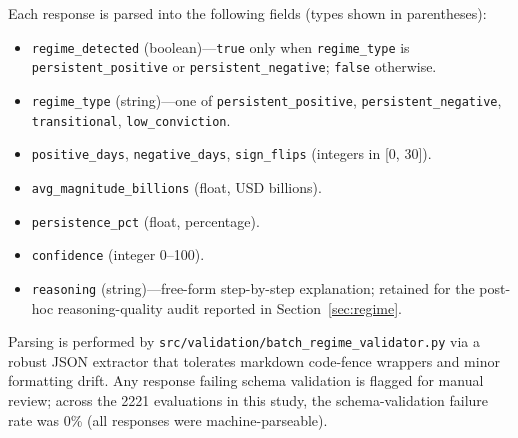 \documentclass[jrfm,article,accept,moreauthors,pdftex]{Definitions/mdpi}
\begin{document}
Each response is parsed into the following fields (types shown in
parentheses):

\begin{itemize}
    \item \texttt{regime\_detected} (boolean)---\texttt{true} only when
          \texttt{regime\_type} is \texttt{persistent\_positive} or
          \texttt{persistent\_negative}; \texttt{false} otherwise.
    \item \texttt{regime\_type} (string)---one of
          \texttt{persistent\_positive}, \texttt{persistent\_negative}, \linebreak
          \texttt{transitional}, \texttt{low\_conviction}.
    \item \texttt{positive\_days}, \texttt{negative\_days},
          \texttt{sign\_flips} (integers in [0, 30]).
    \item \texttt{avg\_magnitude\_billions} (float, USD billions).
    \item \texttt{persistence\_pct} (float, percentage).
    \item \texttt{confidence} (integer 0--100).
    \item \texttt{reasoning} (string)---free-form step-by-step
          explanation; retained for the post-hoc reasoning-quality audit
          reported in Section~\ref{sec:regime}.
\end{itemize}

\noindent
{Parsing} %
 is performed by \texttt{src/validation/batch\_regime\_validator.py}
via a robust JSON extractor that tolerates markdown code-fence wrappers
and minor formatting drift. Any response failing schema validation is
flagged for manual review; across the 2221 evaluations in this study,
the schema-validation failure rate was 0\% (all responses were
\mbox{machine-parseable).}
\end{document}
